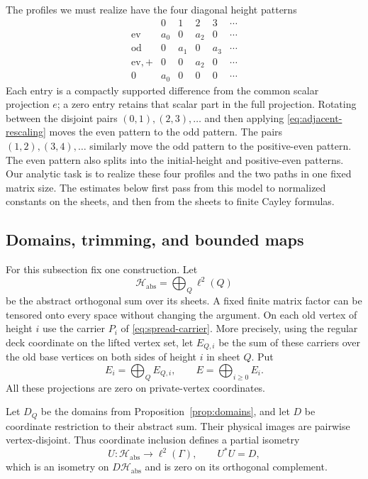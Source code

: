 The profiles we must realize have the four diagonal height patterns
\[
 \begin{array}{c|ccccc}
  &0&1&2&3&\cdots\\ \hline
  \mathrm{ev}&a_0&0&a_2&0&\cdots\\
  \mathrm{od}&0&a_1&0&a_3&\cdots\\
  \mathrm{ev},+&0&0&a_2&0&\cdots\\
  0&a_0&0&0&0&\cdots
 \end{array}
\]
Each entry is a compactly supported difference from the common scalar
projection $e$; a zero entry retains that scalar part in the full projection.  Rotating
between the disjoint pairs $(0,1),(2,3),\ldots$ and then applying
\eqref{eq:adjacent-rescaling} moves the even pattern to the odd pattern.
The pairs $(1,2),(3,4),\ldots$ similarly move the odd pattern to the
positive-even pattern.  The even pattern also splits into the
initial-height and positive-even patterns.  Our analytic task is to
realize these four profiles and the two paths in one fixed matrix size.
The estimates below first pass from this model to normalized constants
on the sheets, and then from the sheets to finite Cayley formulas.

\subsection{Domains, trimming, and bounded maps}

For this subsection fix one construction.  Let
\[
 \mathscr H_{\mathrm{abs}}=\bigoplus_Q\ell^2(Q)
\]
be the abstract orthogonal sum over its sheets.  A fixed finite matrix factor
can be tensored onto every space without changing the argument.  On each
old vertex of height $i$ use the carrier $P_i$ of
\eqref{eq:spread-carrier}.  More precisely, using the regular deck coordinate
on the lifted vertex set, let $E_{Q,i}$ be the sum of these carriers over the
old base vertices on both sides of height $i$ in sheet $Q$.  Put
\[
 E_i=\bigoplus_Q E_{Q,i},\qquad E=\bigoplus_{i\ge0}E_i.
\]
All these projections are zero on private-vertex coordinates.

Let $D_Q$ be the domains from Proposition~\ref{prop:domains}, and let $D$ be
coordinate restriction to their abstract sum.  Their physical images are
pairwise vertex-disjoint.  Thus coordinate inclusion defines a partial
isometry
\[
 U\colon\mathscr H_{\mathrm{abs}}\longrightarrow\ell^2(\Gamma),
 \qquad U^*U=D,
\]
which is an isometry on $D\mathscr H_{\mathrm{abs}}$ and is zero on its
orthogonal complement.

